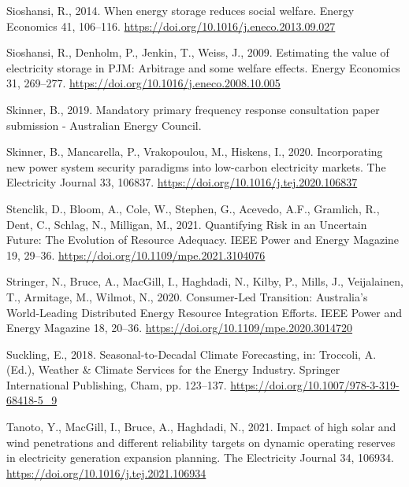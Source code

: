 \documentclass[12pt,a4paper,]{report}
\newlength{\cslhangindent}
\newenvironment{CSLReferences}[2] %
 {%
  \setlength{\parindent}{0pt}
  \ifodd #1 \everypar{\setlength{\hangindent}{\cslhangindent}}\ignorespaces\fi
  \ifnum #2 > 0
  \setlength{\parskip}{#2\baselineskip}
  \fi
 }%
 {}
\begin{document}
\begin{CSLReferences}{1}{0}
\leavevmode{}%
Sioshansi, R., 2014. When energy storage reduces social welfare. Energy
Economics 41, 106--116.
\url{https://doi.org/10.1016/j.eneco.2013.09.027}

\leavevmode{}%
Sioshansi, R., Denholm, P., Jenkin, T., Weiss, J., 2009. Estimating the
value of electricity storage in {PJM}: {Arbitrage} and some welfare
effects. Energy Economics 31, 269--277.
\url{https://doi.org/10.1016/j.eneco.2008.10.005}

\leavevmode{}%
Skinner, B., 2019. Mandatory primary frequency response consultation
paper submission - {Australian Energy Council}.

\leavevmode{}%
Skinner, B., Mancarella, P., Vrakopoulou, M., Hiskens, I., 2020.
Incorporating new power system security paradigms into low-carbon
electricity markets. The Electricity Journal 33, 106837.
\url{https://doi.org/10.1016/j.tej.2020.106837}

\leavevmode{}%
Stenclik, D., Bloom, A., Cole, W., Stephen, G., Acevedo, A.F., Gramlich,
R., Dent, C., Schlag, N., Milligan, M., 2021. Quantifying {Risk} in an
{Uncertain Future}: {The Evolution} of {Resource Adequacy}. IEEE Power
and Energy Magazine 19, 29--36.
\url{https://doi.org/10.1109/mpe.2021.3104076}

\leavevmode{}%
Stringer, N., Bruce, A., MacGill, I., Haghdadi, N., Kilby, P., Mills,
J., Veijalainen, T., Armitage, M., Wilmot, N., 2020. Consumer-{Led
Transition}: {Australia}'s {World-Leading Distributed Energy Resource
Integration Efforts}. IEEE Power and Energy Magazine 18, 20--36.
\url{https://doi.org/10.1109/mpe.2020.3014720}

\leavevmode{}%
Suckling, E., 2018. Seasonal-to-{Decadal Climate Forecasting}, in:
Troccoli, A. (Ed.), Weather \& {Climate Services} for the {Energy
Industry}. Springer International Publishing, Cham, pp. 123--137.
\url{https://doi.org/10.1007/978-3-319-68418-5_9}

\leavevmode{}%
Tanoto, Y., MacGill, I., Bruce, A., Haghdadi, N., 2021. Impact of high
solar and wind penetrations and different reliability targets on dynamic
operating reserves in electricity generation expansion planning. The
Electricity Journal 34, 106934.
\url{https://doi.org/10.1016/j.tej.2021.106934}


\end{CSLReferences}
\end{document}
